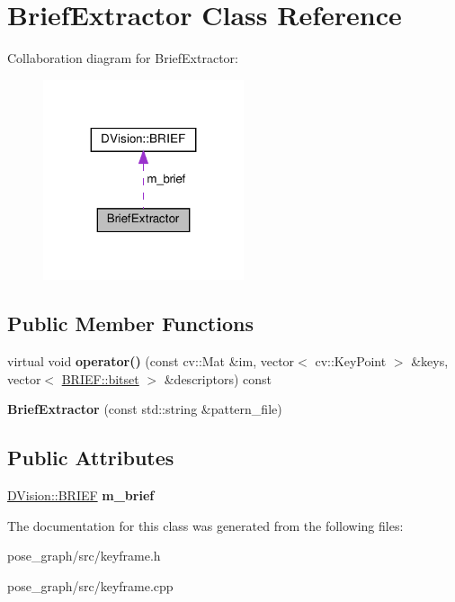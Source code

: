 \hypertarget{classBriefExtractor}{}\section{Brief\+Extractor Class Reference}
\label{classBriefExtractor}


Collaboration diagram for Brief\+Extractor\+:\nopagebreak
\begin{figure}[H]
\begin{center}
\leavevmode
\includegraphics[width=167pt]{classBriefExtractor__coll__graph}
\end{center}
\end{figure}
\subsection*{Public Member Functions}
\begin{DoxyCompactItemize}
\item 
\mbox{\label{classBriefExtractor_a435b32055ac9080bf87cd82304e67478}} 
virtual void {\bfseries operator()} (const cv\+::\+Mat \&im, vector$<$ cv\+::\+Key\+Point $>$ \&keys, vector$<$ \hyperlink{classDVision_1_1BRIEF_abc56a095174a93b0741099f35230b7c5}{B\+R\+I\+E\+F\+::bitset} $>$ \&descriptors) const
\item 
\mbox{\label{classBriefExtractor_a563dde40269338c5518d8bb81c774a41}} 
{\bfseries Brief\+Extractor} (const std\+::string \&pattern\+\_\+file)
\end{DoxyCompactItemize}
\subsection*{Public Attributes}
\begin{DoxyCompactItemize}
\item 
\mbox{\label{classBriefExtractor_aa30592d6bb3a22172b09376594768387}} 
\hyperlink{classDVision_1_1BRIEF}{D\+Vision\+::\+B\+R\+I\+EF} {\bfseries m\+\_\+brief}
\end{DoxyCompactItemize}


The documentation for this class was generated from the following files\+:\begin{DoxyCompactItemize}
\item 
pose\+\_\+graph/src/keyframe.\+h\item 
pose\+\_\+graph/src/keyframe.\+cpp\end{DoxyCompactItemize}
